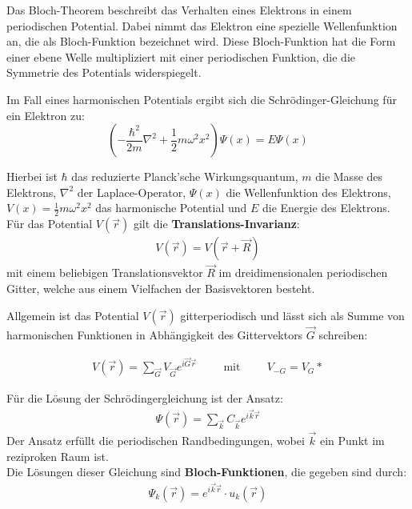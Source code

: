 \label{q:8}

Das Bloch-Theorem beschreibt das Verhalten eines Elektrons in einem periodischen Potential. Dabei nimmt das Elektron eine spezielle Wellenfunktion an, die als Bloch-Funktion bezeichnet wird. Diese Bloch-Funktion hat die Form einer ebene Welle multipliziert mit einer periodischen Funktion, die die Symmetrie des Potentials widerspiegelt.

Im Fall eines harmonischen Potentials ergibt sich die Schrödinger-Gleichung für ein Elektron zu:
\begin{equation}
    \left(-\frac{\hbar^2}{2m} \nabla^2 + \frac{1}{2}m \omega^2 x^2\right) \Psi (x) = E \Psi(x)
\end{equation}

Hierbei ist $\hbar$ das reduzierte Planck'sche Wirkungsquantum, $m$ die Masse des Elektrons, $\nabla^2$ der Laplace-Operator, $\Psi (x)$ die Wellenfunktion des Elektrons, $V(x)=\frac{1}{2}m \omega^2 x^2$ das harmonische Potential und $E$ die Energie des Elektrons.
Für das Potential $V(\vec{r})$ gilt die \textbf{Translations-Invarianz}:
\begin{align}
    V(\vec{r}) = V(\vec{r} + \vec{R})
\end{align}
mit einem beliebigen Translationsvektor $\vec{R}$ im dreidimensionalen periodischen Gitter, welche aus einem Vielfachen der Basisvektoren besteht.

Allgemein ist das Potential $V(\vec{r})$ gitterperiodisch und lässt sich als Summe von harmonischen Funktionen in Abhängigkeit des Gittervektors $\vec{G}$ schreiben:

\begin{align}
    V(\vec{r}) = \sum_{\vec{G}} V_{\vec{G}} e^{i \vec{G} \vec{r}} \hspace{1cm} \mbox{mit} \hspace{1cm} V_{-G} = V_G*
\end{align}

Für die Lösung der Schrödingergleichung ist der Ansatz:
\begin{align}
    \Psi(\vec{r}) = \sum_{\vec{k}}  C_{\vec{k}} e^{i \vec{k} \vec{r}}
\end{align}
Der Ansatz erfüllt die periodischen Randbedingungen, wobei $\vec{k}$ ein Punkt im reziproken Raum ist. \\

Die Lösungen dieser Gleichung sind \textbf{Bloch-Funktionen}, die gegeben sind durch:
\begin{align}
    \Psi_k (\vec{r}) = e^{i\vec{k}\vec{r}} \cdot u_k(\vec{r})
\end{align}

